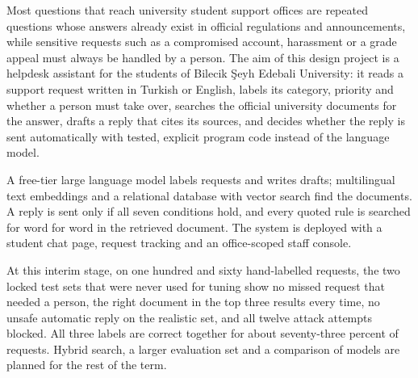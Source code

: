 Most questions that reach university student support offices are repeated questions whose answers
already exist in official regulations and announcements, while sensitive requests such as a
compromised account, harassment or a grade appeal must always be handled by a person. The aim of
this design project is a helpdesk assistant for the students of Bilecik Şeyh Edebali University: it
reads a support request written in Turkish or English, labels its category, priority and whether a
person must take over, searches the official university documents for the answer, drafts a reply
that cites its sources, and decides whether the reply is sent automatically with tested, explicit
program code instead of the language model.

A free-tier large language model labels requests and writes drafts; multilingual text embeddings
and a relational database with vector search find the documents. A reply is sent only if all seven
conditions hold, and every quoted rule is searched for word for word in the retrieved document. The
system is deployed with a student chat page, request tracking and an office-scoped staff console.

At this interim stage, on one hundred and sixty hand-labelled requests, the two locked test sets
that were never used for tuning show no missed request that needed a person, the right document in
the top three results every time, no unsafe automatic reply on the realistic set, and all twelve
attack attempts blocked. All three labels are correct together for about seventy-three percent of
requests. Hybrid search, a larger evaluation set and a comparison of models are planned for the rest
of the term.

\vspace{1cm}
